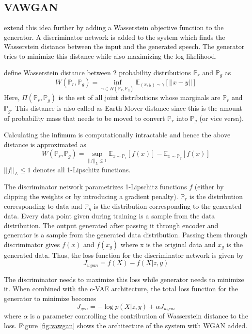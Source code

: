 \documentclass[letterpaper]{article}
\begin{document}
\subsection{VAWGAN}
\cite{vawgan} extend this idea further by adding a Wasserstein objective function to the generator. A discriminator network is added to the system which finds the Wasserstein distance between the input and the generated speech. The generator tries to minimize this distance while also maximizing the log likelihood.

\cite{wgan} define Wasserstein distance between 2 probability distributions $\mathbb{P}_r$ and $\mathbb{P}_g$ as
\[W(\mathbb{P}_r, \mathbb{P}_g)=\inf_{\gamma \in \Pi(\mathbb{P}_r,\mathbb{P}_g)} \mathbb{E}_{(x,y)\sim \gamma} \left[||x-y|| \right] \]
Here, $\Pi(\mathbb{P}_r,\mathbb{P}_g)$ is the set of all joint distributions whose marginals are $\mathbb{P}_r$ and $\mathbb{P}_g$. This distance is also called as Earth Mover distance since this is the amount of probability mass that needs to be moved to convert $\mathbb{P}_r$ into $\mathbb{P}_g$ (or vice versa).

Calculating the infimum is computationally intractable and hence the above distance is approximated as
\[W(\mathbb{P}_r, \mathbb{P}_g)=\sup_{||f||_L \leq 1} \mathbb{E}_{x\sim \mathbb{P}_r} \left[f(x)\right] - \mathbb{E}_{x\sim \mathbb{P}_g} \left[f(x)\right] \]
$||f||_L \leq 1$ denotes all 1-Lipschitz functions.

The discriminator network parametrizes 1-Lipschitz functions $f$ (either by clipping the weights or by introducing a gradient penalty). $\mathbb{P}_r$ is the distribution corresponding to data and $\mathbb{P}_g$ is the distribution corresponding to the generated data. Every data point given during training is a sample from the data distribution. The output generated after passing it through encoder and generator is a sample from the generated data distribution. Passing them through discriminator gives $f(x)$ and $f(x_g)$ where x is the original data and $x_g$ is the generated data. Thus, the loss function for the discriminator network is given by
\[J_{wgan}= f(X)-f(X|z,y) \]

The discriminator needs to maximize this loss while generator needs to minimize it. When combined with the c-VAE architecture, the total loss function for the generator to minimize becomes 
\[J_{gen}=-\log p(X|z,y) + \alpha J_{wgan} \]
where $\alpha$ is a parameter controlling the contribution of Wasserstein distance to the loss. Figure \ref{fig:vawgan} shows the architecture of the system with WGAN added.
\end{document}

